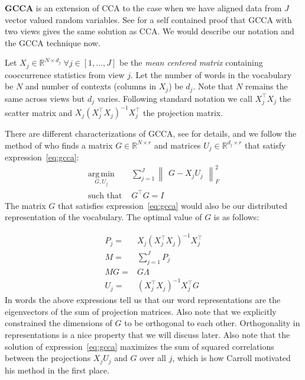 \documentclass[11pt]{article}
\begin{document}
\textbf{GCCA} is an extension of CCA to the case when we have aligned data from $J$
vector valued random variables. See \cite{velden2011on} for a self
contained proof that GCCA with two views gives the same solution as
CCA. We would describe our notation and the GCCA technique now.

Let $X_j \in \mathbb{R}^{N\times d_j} \; \forall j \in [1,\ldots,J]$
be the \textit{mean centered matrix} containing cooccurrence statistics from view 
$j$. Let the number of words in the vocabulary be $N$ and number of
contexts (columns in $X_j$) be $d_j$. Note that $N$ remains the same across views
but  $d_j$ varies. Following standard notation
\cite{hastie2009elements} we call $X_j^\top X_j$
the scatter matrix  and $X_j (X_j^\top X_j)^{-1}X_j^\top$ the
projection matrix.

There are different characterizations of GCCA, see
\cite{kettenring1971canonical} for details, and we follow the method
of \cite{carroll1968generalization} who finds 
 a matrix $G \in \mathbb{R}^{N\times r}$ and matrices  $U_j \in
 \mathbb{R}^{d_j \times r}$ that satisfy expression~\ref{eq:gcca}:
\begin{equation}
  \label{eq:gcca}
\begin{split}
  \operatorname*{\arg\,\min}_{G,U_j} & \sum_{j=1}^J \begin{Vmatrix} G - X_jU_j \end{Vmatrix}^2_F \\
  \text{such that } & G^\top G = I
\end{split}
\end{equation}
The matrix $G$ that satisfies expression~\ref{eq:gcca} would also be our
distributed representation of the vocabulary.
The optimal value of $G$ is as follows:

\begin{align}
P_j =& X_j(X_j^\top X_j)^{-1}X_j^\top \label{eq:pp}\\
M =& \sum_{j=1}^J P_j \label{eq:mm}\\
M G =& G \Lambda\\
U_j =& \left(X_j^\top X_j\right)^{-1} X_j^\top G
\end{align}
In words the above
expressions tell us that our word representations are the
eigenvectors of the sum of projection matrices. Also note that we
explicitly constrained the dimensions of  $G$ to be orthogonal to each other. Orthogonality in
representations is a nice property that we will discuss later. Also note that
the solution of expression~\ref{eq:gcca} maximizes the sum
of squared correlations between the projections $X_jU_j$ and $G$ over
all $j$, which is how Carroll
motivated his method in the first place.
\end{document}

